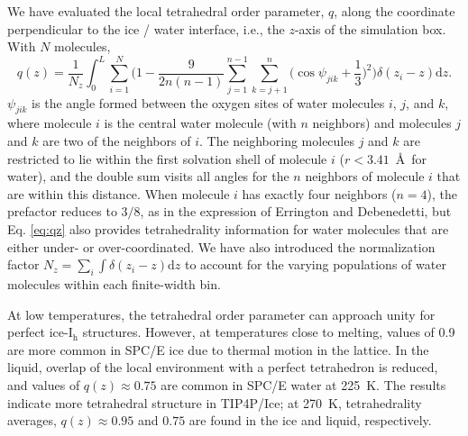 We have evaluated the local tetrahedral order parameter, $q$, along
the coordinate perpendicular to the ice / water interface, i.e., the
$z$-axis of the simulation box. With $N$ molecules,
\begin{equation}
q(z) = \frac{1}{N_z} \int_0^L \sum_{i=1}^{N} \Bigg(1 -\frac{9}{2n(n-1)}\sum_{j=1}^{n-1}
\sum_{k=j+1}^{n} \bigg(\cos\psi_{jik}+\frac{1}{3}\bigg)^2\Bigg)
\delta(z_{i}-z)\mathrm{d}z .
\label{eq:qz}
\end{equation}
$\psi_{jik}$ is the angle formed between the oxygen sites of water
molecules $i$, $j$, and $k$, where molecule $i$ is the central water
molecule (with $n$ neighbors) and molecules $j$ and $k$ are two of the
neighbors of $i$.  The neighboring molecules $j$ and $k$ are
restricted to lie within the first solvation shell of molecule $i$
($r < 3.41$~\AA\ for water), and the double sum visits all angles for
the $n$ neighbors of molecule $i$ that are within this distance.  When
molecule $i$ has exactly four neighbors ($n=4$), the prefactor reduces
to $3/8$, as in the expression of Errington and Debenedetti, but
Eq. \eqref{eq:qz} also provides tetrahedrality information for water
molecules that are either under- or over-coordinated. We have also
introduced the normalization factor
$N_z = \sum_i \int \delta(z_i - z) \mathrm{d}z$ to account for the
varying populations of water molecules within each finite-width bin.

At low temperatures, the tetrahedral order parameter can approach
unity for perfect ice-I$_\mathrm{h}$ structures. However, at
temperatures close to melting, values of 0.9 are more common in SPC/E
ice due to thermal motion in the lattice. In the liquid, overlap of
the local environment with a perfect tetrahedron is reduced, and
values of $q(z) \approx 0.75$ are common in SPC/E water at 225~K. The
results indicate more tetrahedral structure in TIP4P/Ice; at
270~K, tetrahedrality averages, $q(z) \approx 0.95$ and $0.75$ are
found in the ice and liquid, respectively.


